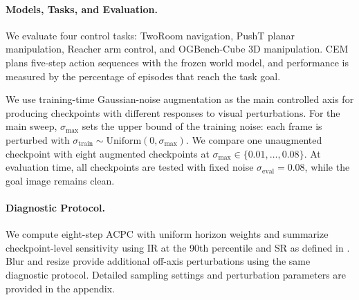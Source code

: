 \documentclass{article}
\begin{document}


\paragraph{Models, Tasks, and Evaluation.}
We evaluate four control tasks: TwoRoom navigation, PushT planar manipulation,
Reacher arm control, and OGBench-Cube 3D manipulation. CEM plans five-step
action sequences with the frozen world model, and performance is measured by
the percentage of episodes that reach the task goal.

We use training-time Gaussian-noise augmentation as the main controlled axis
for producing checkpoints with different responses to visual perturbations.
For the main sweep, $\sigma_{\max}$ sets the upper bound of the training noise:
each frame is perturbed with
$\sigma_{\mathrm{train}}\sim\mathrm{Uniform}(0,\sigma_{\max})$.
We compare one unaugmented checkpoint with eight augmented checkpoints at
$\sigma_{\max}\in\{0.01,\ldots,0.08\}$. At evaluation time, all checkpoints
are tested with fixed noise $\sigma_{\mathrm{eval}}=0.08$, while the goal
image remains clean.

\paragraph{Diagnostic Protocol.}
We compute eight-step ACPC with uniform horizon weights and summarize
checkpoint-level sensitivity using IR at the 90th percentile and SR as defined
in . Blur and resize provide additional off-axis
perturbations using the same diagnostic protocol. Detailed sampling settings
and perturbation parameters are provided in the appendix.
\end{document}
